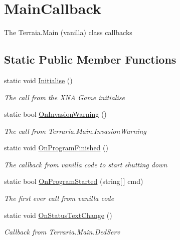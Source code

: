 \hypertarget{classOTA_1_1Callbacks_1_1MainCallback}{}\section{Main\+Callback}
\label{classOTA_1_1Callbacks_1_1MainCallback}


The Terraia.\+Main (vanilla) class callbacks  


\subsection*{Static Public Member Functions}
\begin{DoxyCompactItemize}
\item 
static void \hyperlink{classOTA_1_1Callbacks_1_1MainCallback_a313d283897b7cb30f0890a56ce2a505d}{Initialise} ()
\begin{DoxyCompactList}\small\item\em The call from the X\+N\+A Game initialise \end{DoxyCompactList}\item 
static bool \hyperlink{classOTA_1_1Callbacks_1_1MainCallback_a9943d5d38ba7f3dd3c86680a62febc0c}{On\+Invasion\+Warning} ()
\begin{DoxyCompactList}\small\item\em The call from Terraria.\+Main.\+Invasion\+Warning \end{DoxyCompactList}\item 
static void \hyperlink{classOTA_1_1Callbacks_1_1MainCallback_ad95b43f9b36ad3484cb24d4f7b2eaa5b}{On\+Program\+Finished} ()
\begin{DoxyCompactList}\small\item\em The callback from vanilla code to start shutting down \end{DoxyCompactList}\item 
static bool \hyperlink{classOTA_1_1Callbacks_1_1MainCallback_a19ba43e4cbc51f971a0448c5c7140bb0}{On\+Program\+Started} (string\mbox{[}$\,$\mbox{]} cmd)
\begin{DoxyCompactList}\small\item\em The first ever call from vanilla code \end{DoxyCompactList}\item 
static void \hyperlink{classOTA_1_1Callbacks_1_1MainCallback_ac209dd42ae36094c020228b057df951d}{On\+Status\+Text\+Change} ()
\begin{DoxyCompactList}\small\item\em Callback from Terraria.\+Main.\+Ded\+Serv \end{DoxyCompactList}\item 

\end{DoxyCompactItemize}
